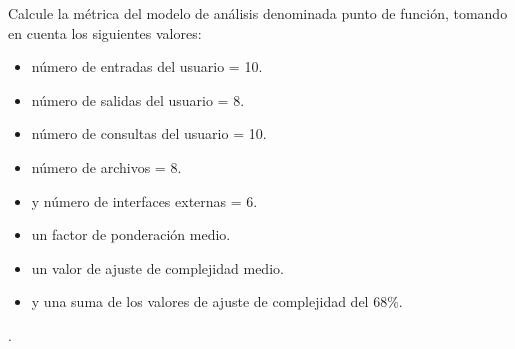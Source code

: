 Calcule la métrica del modelo de análisis denominada punto de función, tomando en cuenta los siguientes valores:

\begin{itemize}
\item número de entradas del usuario = 10.
\item número de salidas del usuario = 8.
\item número de consultas del usuario = 10.
\item número de archivos = 8.
\item y número de interfaces externas = 6.
\item un factor de ponderación medio.
\item un valor de ajuste de complejidad medio.
\item y una suma de los valores de ajuste de complejidad del 68\%.
\end{itemize}

.
